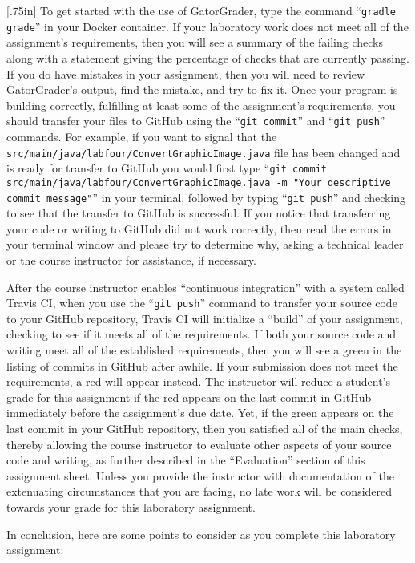 \documentclass[11pt]{article}
\newcommand{\mainprogramsource}{\lstinline{src/main/java/labfour/ConvertGraphicImage.java}}
\newcommand{\gatorgraderstart}{\command{gradle grade}}
\newcommand{\gitcommit}{\command{git commit}}
\newcommand{\gitpush}{\command{git push}}
\newcommand{\gitcommitmainprogram}{\command{git commit src/main/java/labfour/ConvertGraphicImage.java -m "Your
descriptive commit message"}}
\newcommand{\command}[1]{``\lstinline{#1}''}
\newcommand{\step}[1]{``{#1}''}
\newcommand{\checkmark}{\ding{51}}
\newcommand{\naughtmark}{\ding{55}}
\newcommand{\caution}[1]{\null\hfill\LARGE{\faWarning{}}\newline\scriptsize{\em{#1}}}
\begin{document}
\marginnote{\caution{Write useful commits}}[.75in] To get started with the use
of GatorGrader, type the command \gatorgraderstart{} in your Docker container.
If your laboratory work does not meet all of the assignment's requirements, then
you will see a summary of the failing checks along with a statement giving the
percentage of checks that are currently passing. If you do have mistakes in your
assignment, then you will need to review GatorGrader's output, find the mistake,
and try to fix it. Once your program is building correctly, fulfilling at least
some of the assignment's requirements, you should transfer your files to GitHub
using the \gitcommit{} and \gitpush{} commands. For example, if you want to
signal that the \mainprogramsource{} file has been changed and is ready for
transfer to GitHub you would first type \gitcommitmainprogram{} in your
terminal, followed by typing \gitpush{} and checking to see that the transfer to
GitHub is successful. If you notice that transferring your code or writing to
GitHub did not work correctly, then read the errors in your terminal window and
please try to determine why, asking a technical leader or the course instructor
for assistance, if necessary.

After the course instructor enables \step{continuous integration} with a system
called Travis CI, when you use the \gitpush{} command to transfer your source
code to your GitHub repository, Travis CI will initialize a \step{build} of your
assignment, checking to see if it meets all of the requirements. If both your
source code and writing meet all of the established requirements, then you will
see a green \checkmark{} in the listing of commits in GitHub after awhile. If
your submission does not meet the requirements, a red \naughtmark{} will appear
instead. The instructor will reduce a student's grade for this assignment if the
red \naughtmark{} appears on the last commit in GitHub immediately before the
assignment's due date. Yet, if the green \checkmark{} appears on the last commit
in your GitHub repository, then you satisfied all of the main checks, thereby
allowing the course instructor to evaluate other aspects of your source code and
writing, as further described in the \step{Evaluation} section of this
assignment sheet. Unless you provide the instructor with documentation of the
extenuating circumstances that you are facing, no late work will be considered
towards your grade for this laboratory assignment.

In conclusion, here are some points to consider as you complete this laboratory
assignment:
\end{document}

